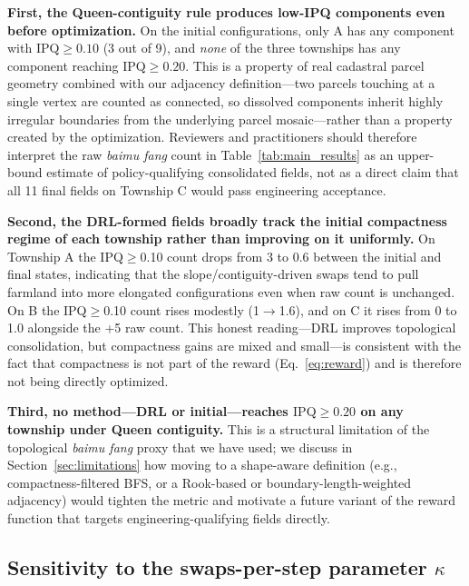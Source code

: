 \documentclass[preprint,12pt]{elsarticle}
\begin{document}
\textbf{First, the Queen-contiguity rule produces low-IPQ components even before optimization.} On the initial configurations, only A has any component with $\mathrm{IPQ} \geq 0.10$ (3 out of 9), and \textit{none} of the three townships has any component reaching $\mathrm{IPQ} \geq 0.20$. This is a property of real cadastral parcel geometry combined with our adjacency definition---two parcels touching at a single vertex are counted as connected, so dissolved components inherit highly irregular boundaries from the underlying parcel mosaic---rather than a property created by the optimization. Reviewers and practitioners should therefore interpret the raw \textit{baimu fang} count in Table~\ref{tab:main_results} as an upper-bound estimate of policy-qualifying consolidated fields, not as a direct claim that all 11 final fields on Township C would pass engineering acceptance.

\textbf{Second, the DRL-formed fields broadly track the initial compactness regime of each township rather than improving on it uniformly.} On Township A the IPQ$\geq$0.10 count drops from 3 to 0.6 between the initial and final states, indicating that the slope/contiguity-driven swaps tend to pull farmland into more elongated configurations even when raw count is unchanged. On B the IPQ$\geq$0.10 count rises modestly (1$\rightarrow$1.6), and on C it rises from 0 to 1.0 alongside the +5 raw count. This honest reading---DRL improves topological consolidation, but compactness gains are mixed and small---is consistent with the fact that compactness is not part of the reward (Eq.~\ref{eq:reward}) and is therefore not being directly optimized.

\textbf{Third, no method---DRL or initial---reaches $\mathrm{IPQ} \geq 0.20$ on any township under Queen contiguity.} This is a structural limitation of the topological \textit{baimu fang} proxy that we have used; we discuss in Section~\ref{sec:limitations} how moving to a shape-aware definition (e.g., compactness-filtered BFS, or a Rook-based or boundary-length-weighted adjacency) would tighten the metric and motivate a future variant of the reward function that targets engineering-qualifying fields directly.

\subsection{Sensitivity to the swaps-per-step parameter $\kappa$}
\label{sec:kappa_ablation}
\end{document}
